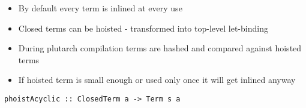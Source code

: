 \documentclass{beamer}
\begin{document}
\begin{frame}
  \begin{itemize}
    \item By default every term is inlined at every use
    \item Closed terms can be hoisted - transformed into top-level let-binding
    \item During plutarch compilation terms are hashed and compared against hoisted terms
    \item If hoisted term is small enough or used only once it will get inlined anyway
    \end{itemize}
\begin{verbatim}
phoistAcyclic :: ClosedTerm a -> Term s a
\end{verbatim}
\end{frame}
\end{document}
